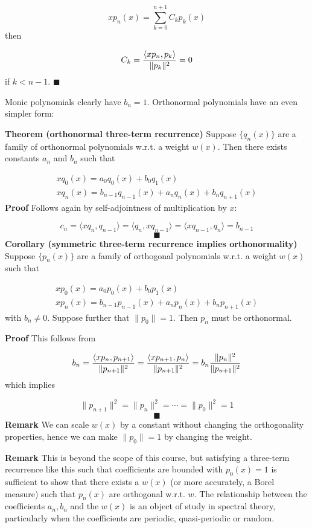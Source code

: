 \documentclass[12pt,a4paper]{article}
\begin{document}
\[
x p_n(x) = \sum_{k=0}^{n+1} C_k p_k(x)
\]
then

\[
C_k = {\langle x p_n, p_k\rangle \over \| p_k\|^2} = 0
\]
if $k < n-1$. $\blacksquare$

Monic polynomials clearly have $b_n = 1$.  Orthonormal polynomials have an even simpler form:

\textbf{Theorem (orthonormal three-term recurrence)} Suppose $\{q_n(x)\}$ are a family of orthonormal polynomials w.r.t. a weight $w(x)$. Then there exists constants $a_n$ and $b_n$ such that


\begin{align*}
x q_0(x) = a_0 q_0(x)  + b_0 q_1(x)\\
x q_n(x) = b_{n-1} q_{n-1}(x) + a_n q_n(x) + b_{n} q_{n+1}(x)
\end{align*}
\textbf{Proof} Follows again by self-adjointness of multiplication by $x$:

\[
c_n = \langle x q_n, q_{n-1}\rangle = \langle q_n, x q_{n-1}\rangle = \langle x q_{n-1}, q_n\rangle = b_{n-1}
\]
\[
\blacksquare
\]
\textbf{Corollary (symmetric three-term recurrence implies orthonormality)} Suppose $\{p_n(x)\}$ are a family of orthogonal polynomials w.r.t. a weight $w(x)$ such that


\begin{align*}
x p_0(x) = a_0 p_0(x)  + b_0 p_1(x)\\
x p_n(x) = b_{n-1} p_{n-1}(x) + a_n p_n(x) + b_{n} p_{n+1}(x)
\end{align*}
with $b_n \neq 0$. Suppose further that $\| p_0 \| = 1$. Then $p_n$ must be orthonormal.

\textbf{Proof} This follows from

\[
b_n = {\langle x p_n,p_{n+1} \rangle \over \| p_{n+1}\|^2} = {\langle x p_{n+1}, p_n\rangle \over \|p_{n+1}\|^2} = b_n   {\|p_n\|^2 \over \|p_{n+1}\|^2 }
\]
which implies

\[
\|p_{n+1}\|^2 = \|p_n\|^2 = \cdots = \|p_0\|^2 = 1
\]
\[
\blacksquare
\]
\textbf{Remark} We can scale $w(x)$ by a constant without changing the orthogonality properties, hence we can make $\|p_0\| = 1$ by changing the weight.

\textbf{Remark} This is beyond the scope of this course, but satisfying a three-term recurrence like this such that coefficients are bounded with $p_0(x) = 1$ is sufficient to show that there exists a $w(x)$ (or more accurately, a Borel measure) such that $p_n(x)$ are orthogonal w.r.t. $w$. The relationship between the coefficients $a_n,b_n$ and the $w(x)$ is an object of study in spectral theory, particularly when the coefficients are periodic, quasi-periodic or random.
\end{document}
